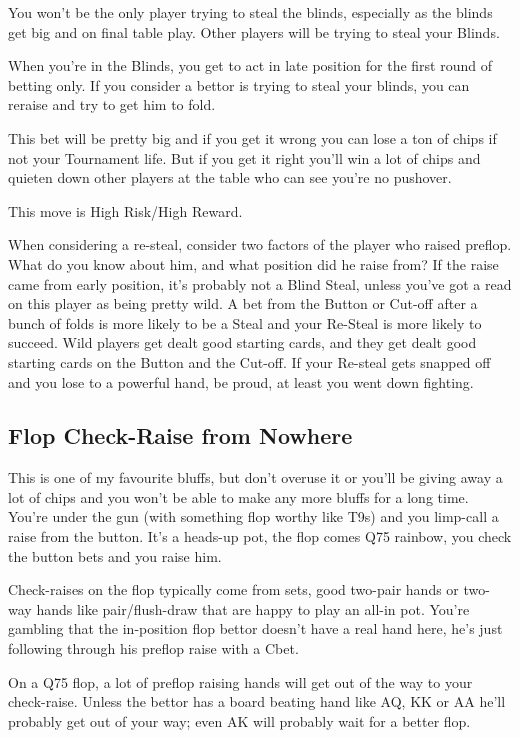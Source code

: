 You won't be the only player trying to steal the blinds, especially
as the blinds get big and on final table play. Other players will
be trying to steal your Blinds.

When you're in the Blinds, you get to act in late position for
the first round of betting only. If you consider a bettor is
trying to steal your blinds, you can reraise and try to
get him to fold.

This bet will be pretty big and if you get it wrong you can
lose a ton of chips if not your Tournament life. But if you get
it right you'll win a lot of chips and quieten down other
players at the table who can see you're no pushover.

This move is High Risk/High Reward.

When considering a re-steal, consider two factors of the player who
raised preflop. What do you know about him, and what position did he
raise from? If the raise came from early position, it's probably not a
Blind Steal, unless you've got a read on this player as being pretty
wild. A bet from the Button or Cut-off after a bunch of folds is more
likely to be a Steal and your Re-Steal is more likely to succeed. Wild
players get dealt good starting cards, and they get dealt good
starting cards on the Button and the Cut-off. If your Re-steal gets
snapped off and you lose to a powerful hand, be proud, at least you
went down fighting.

\subsection{Flop Check-Raise from Nowhere}

This is one of my favourite bluffs, but don't overuse it or you'll be
giving away a lot of chips and you won't be able to make any more
bluffs for a long time. You're under the gun (with something flop
worthy like T9s) and you limp-call a raise from the button. It's
a heads-up pot, the flop comes Q75 rainbow, you check the button bets
and you raise him.

Check-raises on the flop typically come from sets, good two-pair hands
or two-way hands like pair/flush-draw that are happy to play an
all-in pot. You're gambling that the in-position flop bettor doesn't
have a real hand here, he's just following through his preflop raise
with a Cbet.

On a Q75 flop, a lot of preflop raising hands will get out of the way
to your check-raise. Unless the bettor has a board beating hand like
AQ, KK or AA he'll probably get out of your way; even AK will probably
wait for a better flop.

